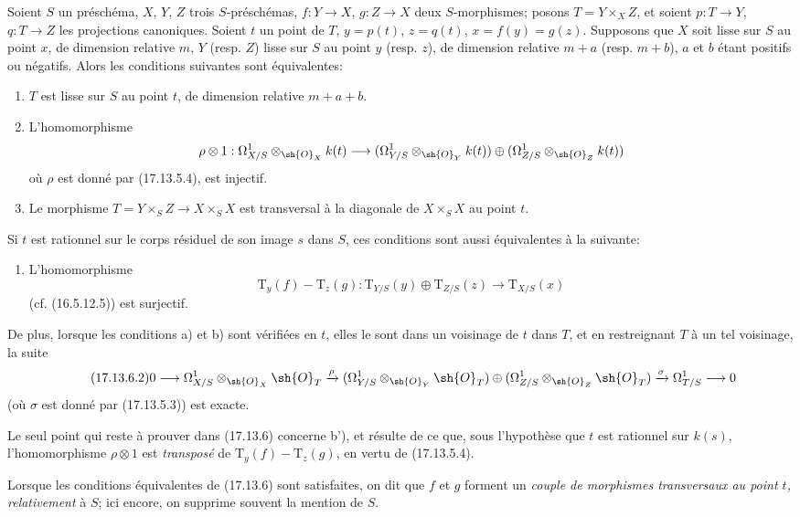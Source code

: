 \begin{corollary}[17.13.6]
\label{IV.17.13.6}
Soient $S$ un préschéma, $X$, $Y$, $Z$ trois $S$-préschémas, $f:Y\to X$, $g:Z\to X$ deux $S$-morphismes; posons $T=Y\times_XZ$, et soient $p:T\to Y$, $q:T\to Z$ les projections canoniques. Soient $t$ un point de $T$, $y=p(t)$, $z=q(t)$, $x=f(y)=g(z)$. Supposons que $X$ soit lisse sur $S$ au point $x$, de dimension relative $m$, $Y$ (resp. $Z$) lisse sur $S$ au point $y$ (resp. $z$), de dimension relative $m+a$ (resp. $m+b$), $a$ et $b$ étant positifs ou négatifs. Alors les conditions suivantes sont équivalentes:
\begin{enumerate}
  \item[a)] $T$ est lisse sur $S$ au point $t$, de dimension relative $m+a+b$.
  \item[b)] L'homomorphisme
  \[
  \rho\otimes1:\Omega^1_{X/S}\otimes_{\sh{O}_X}k(t)\to
  (\Omega^1_{Y/S}\otimes_{\sh{O}_Y}k(t))\oplus
  (\Omega^1_{Z/S}\otimes_{\sh{O}_Z}k(t))
  \]
  où $\rho$ est donné par (17.13.5.4), est injectif.
  \item[c)] Le morphisme $T=Y\times_SZ\to X\times_SX$ est transversal à la diagonale de $X\times_SX$ au point $t$.
\end{enumerate}
Si $t$ est rationnel sur le corps résiduel de son image $s$ dans $S$, ces conditions sont aussi équivalentes à la suivante:
\begin{enumerate}
  \item[b')] L'homomorphisme
  \[
  \label{IV.17.13.6.1}
  \tag{17.13.6.1}
  \mathrm{T}_y(f)-\mathrm{T}_z(g):\mathrm{T}_{Y/S}(y)\oplus\mathrm{T}_{Z/S}(z)\to\mathrm{T}_{X/S}(x)
  \]
  (cf. (16.5.12.5)) est surjectif.
\end{enumerate}
De plus, lorsque les conditions a) et b) sont vérifiées en $t$, elles le sont dans un voisinage de $t$ dans $T$, et en restreignant $T$ à un tel voisinage, la suite
\[
\label{IV.17.13.6.2}
\tag{17.13.6.2}
0\to\Omega^1_{X/S}\otimes_{\sh{O}_X}\sh{O}_T\xrightarrow{\rho}
(\Omega^1_{Y/S}\otimes_{\sh{O}_Y}\sh{O}_T)\oplus
(\Omega^1_{Z/S}\otimes_{\sh{O}_Z}\sh{O}_T)
\xrightarrow{\sigma}\Omega^1_{T/S}\to0
\]
(où $\sigma$ est donné par (17.13.5.3)) est exacte.

Le seul point qui reste à prouver dans (17.13.6) concerne b'), et résulte de ce que, sous l'hypothèse que $t$ est rationnel sur $k(s)$, l'homomorphisme $\rho\otimes1$ est \emph{transposé} de $\mathrm{T}_y(f)-\mathrm{T}_z(g)$, en vertu de (17.13.5.4).

Lorsque les conditions équivalentes de (17.13.6) sont satisfaites, on dit que $f$ et $g$ forment un \emph{couple de morphismes transversaux au point $t$, relativement} à $S$; ici encore, on supprime souvent la mention de $S$.
\end{corollary}

